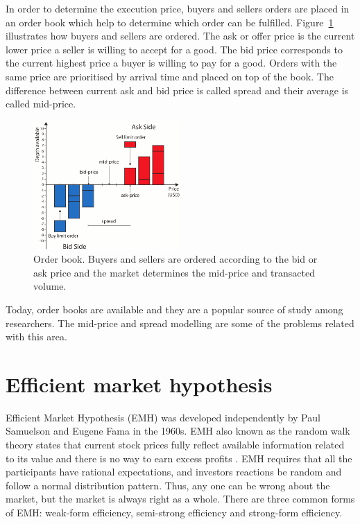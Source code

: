 In order to determine the execution price, buyers and sellers orders are placed
in an order book which help to determine which order can be fulfilled.
Figure~\ref{fig:orderbook} illustrates how buyers and sellers are ordered. The
ask or offer price is the current lower price a seller is willing to accept for
a good. The bid price corresponds to the current highest price a buyer is
willing to pay for a good. Orders with the same price are prioritised by
arrival time and placed on top of the book.  The difference between current ask and bid
price is called spread and their average is called mid-price.

\begin{figure}[!h]
  \centering
  \includegraphics[width=0.5\textwidth]{img/orderbook}
  \caption{Order book. Buyers and sellers are ordered according to the bid or
  ask price and the market determines the mid-price and transacted volume.}
  \label{fig:orderbook}
\end{figure}
Today, order books are available and they are a popular source of study among
researchers. The mid-price and spread modelling are some of the
problems related with this area. 


\section{Efficient market hypothesis}

Efficient Market Hypothesis (EMH) was developed independently by  Paul Samuelson and Eugene Fama in the 1960s.
EMH also known as the random walk theory states that current stock prices fully reflect available information related to its value and there is no way to earn excess profits
\cite{fama1970}. EMH requires that all the participants have rational expectations, and investors reactions be random and follow a normal distribution pattern. Thus, any one can be wrong about the market, but the market is always right as a whole.
There are three common forms of EMH: weak-form efficiency, semi-strong efficiency and strong-form efficiency.

